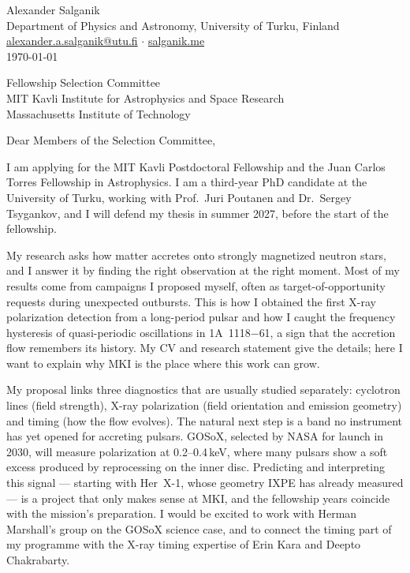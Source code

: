 \documentclass[11pt]{article}
\begin{document}
\begin{flushright}
Alexander Salganik\\
Department of Physics and Astronomy, University of Turku, Finland\\
\href{mailto:alexander.a.salganik@utu.fi}{alexander.a.salganik@utu.fi} $\cdot$
\href{https://salganik.me}{salganik.me}\\
\today
\end{flushright}

Fellowship Selection Committee\\
MIT Kavli Institute for Astrophysics and Space Research\\
Massachusetts Institute of Technology

Dear Members of the Selection Committee,

I am applying for the MIT Kavli Postdoctoral Fellowship and the Juan Carlos Torres
Fellowship in Astrophysics. I am a third-year PhD candidate at the University of
Turku, working with Prof.~Juri Poutanen and Dr.~Sergey Tsygankov, and I will defend
my thesis in summer 2027, before the start of the fellowship.

My research asks how matter accretes onto strongly magnetized neutron stars, and I
answer it by finding the right observation at the right moment. Most of my results come
from campaigns I proposed myself, often as target-of-opportunity requests during
unexpected outbursts. This is how I obtained the first X-ray polarization detection from
a long-period pulsar and how I caught the frequency hysteresis of quasi-periodic
oscillations in 1A~1118$-$61, a sign that the accretion flow remembers its history. My
CV and research statement give the details; here I want to explain why MKI is the place
where this work can grow.

My proposal links three diagnostics that are usually studied separately: cyclotron lines
(field strength), X-ray polarization (field orientation and emission geometry) and timing
(how the flow evolves). The natural next step is a band no instrument has yet opened for
accreting pulsars. GOSoX, selected by NASA for launch in 2030, will measure polarization
at 0.2--0.4\,keV, where many pulsars show a soft excess produced by reprocessing on the
inner disc. Predicting and interpreting this signal --- starting with Her~X-1, whose
geometry IXPE has already measured --- is a project that only makes sense at MKI, and the
fellowship years coincide with the mission's preparation. I would be excited to work with
Herman Marshall's group on the GOSoX science case, and to connect the timing part of my
programme with the X-ray timing expertise of Erin Kara and Deepto Chakrabarty.
\end{document}
